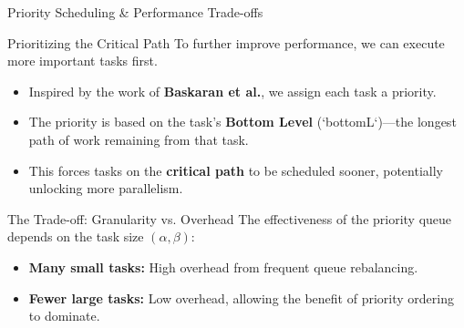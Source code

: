 \begin{frame}{Priority Scheduling \& Performance Trade-offs}

  \begin{block}{Prioritizing the Critical Path}
    To further improve performance, we can execute more important tasks first.
    \begin{itemize}
      \item Inspired by the work of \textbf{Baskaran et al.}, we assign each task a priority.
      \item The priority is based on the task's \textbf{Bottom Level} (`bottomL`)—the longest path of work remaining from that task.
      \item This forces tasks on the \textbf{critical path} to be 
      scheduled sooner, potentially unlocking more parallelism.
    \end{itemize}
  \end{block}

  \begin{alertblock}{The Trade-off: Granularity vs. Overhead}
    The effectiveness of the priority queue depends on the task size $(\alpha, \beta)$:
    \begin{itemize}
      \item \textbf{Many small tasks:} High overhead from frequent queue rebalancing.
      \item \textbf{Fewer large tasks:} Low overhead, allowing the benefit of priority ordering to dominate.
    \end{itemize}
  \end{alertblock}

\end{frame}